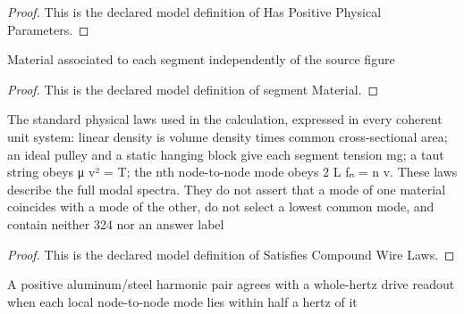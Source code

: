 \begin{proof}
  This is the declared model definition of Has Positive Physical Parameters.
\end{proof}
\begin{definition}
  \label{def:physics:phyx-mini-0299:phyxminiproblems-problemphyxmini0299-segmentmaterial}
  Material associated to each segment independently of the source figure
\end{definition}
\begin{proof}
  This is the declared model definition of segment Material.
\end{proof}
\begin{definition}
  \label{def:physics:phyx-mini-0299:phyxminiproblems-problemphyxmini0299-satisfiescompoundwirelaws}
  The standard physical laws used in the calculation, expressed in every coherent unit system: linear density is volume density times common cross-sectional area; an ideal pulley and a static hanging block give each segment tension mg; a taut string obeys μ v² = T; the nth node-to-node mode obeys 2 L fₙ = n v. These laws describe the full modal spectra. They do not assert that a mode of one material coincides with a mode of the other, do not select a lowest common mode, and contain neither 324 nor an answer label
\end{definition}
\begin{proof}
  This is the declared model definition of Satisfies Compound Wire Laws.
\end{proof}
\begin{definition}
  \label{def:physics:phyx-mini-0299:phyxminiproblems-problemphyxmini0299-modepairmatcheswholehertz}
  A positive aluminum/steel harmonic pair agrees with a whole-hertz drive readout when each local node-to-node mode lies within half a hertz of it
\end{definition}
